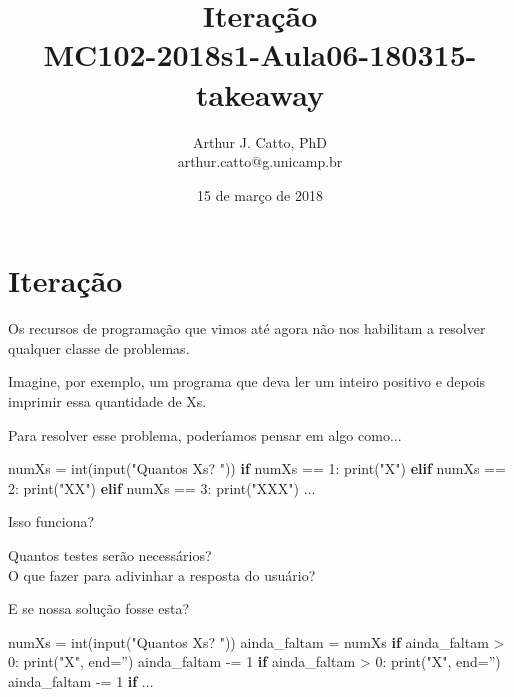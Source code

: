 \documentclass[11pt,a4paper]{article}
\title{Iteração \\
           \small{MC102-2018s1-Aula06-180315-takeaway}
           }
\author{Arthur J. Catto, PhD \\
            \small{arthur.catto@g.unicamp.br}
            }
\date{15 de março de 2018}
\newenvironment{Shaded}{}{}
\newcommand{\DecValTok}[1]{\textcolor[rgb]{0.25,0.63,0.44}{{#1}}}
\newcommand{\StringTok}[1]{\textcolor[rgb]{0.25,0.44,0.63}{{#1}}}
\newcommand{\NormalTok}[1]{{#1}}
\newcommand{\ControlFlowTok}[1]{\textcolor[rgb]{0.00,0.44,0.13}{\textbf{{#1}}}}
\newcommand{\OperatorTok}[1]{\textcolor[rgb]{0.40,0.40,0.40}{{#1}}}
\newcommand{\BuiltInTok}[1]{{#1}}
\begin{document}
    
    
    \maketitle
    
    

    
    \section{Iteração}\label{iterauxe7uxe3o}

    Os recursos de programação que vimos até agora não nos habilitam a
resolver qualquer classe de problemas.

Imagine, por exemplo, um programa que deva ler um inteiro positivo e
depois imprimir essa quantidade de Xs.

    Para resolver esse problema, poderíamos pensar em algo como...

\begin{Shaded}
\begin{Highlighting}[]
\NormalTok{numXs }\OperatorTok{=} \BuiltInTok{int}\NormalTok{(}\BuiltInTok{input}\NormalTok{(}\StringTok{"Quantos Xs? "}\NormalTok{))}
\ControlFlowTok{if}\NormalTok{ numXs }\OperatorTok{==} \DecValTok{1}\NormalTok{:}
   \BuiltInTok{print}\NormalTok{(}\StringTok{"X"}\NormalTok{)}
\ControlFlowTok{elif}\NormalTok{ numXs }\OperatorTok{==} \DecValTok{2}\NormalTok{:}
   \BuiltInTok{print}\NormalTok{(}\StringTok{"XX"}\NormalTok{)}
\ControlFlowTok{elif}\NormalTok{ numXs }\OperatorTok{==} \DecValTok{3}\NormalTok{:}
   \BuiltInTok{print}\NormalTok{(}\StringTok{"XXX"}\NormalTok{)}
\NormalTok{...}
\end{Highlighting}
\end{Shaded}

    Isso funciona?

    Quantos testes serão necessários?\\
O que fazer para adivinhar a resposta do usuário?

    E se nossa solução fosse esta?

    \begin{Shaded}
\begin{Highlighting}[]
\NormalTok{numXs }\OperatorTok{=} \BuiltInTok{int}\NormalTok{(}\BuiltInTok{input}\NormalTok{(}\StringTok{"Quantos Xs? "}\NormalTok{))}
\NormalTok{ainda_faltam }\OperatorTok{=}\NormalTok{ numXs}
\ControlFlowTok{if}\NormalTok{ ainda_faltam }\OperatorTok{>} \DecValTok{0}\NormalTok{:}
   \BuiltInTok{print}\NormalTok{(}\StringTok{"X"}\NormalTok{, end}\OperatorTok{=}\StringTok{''}\NormalTok{)}
\NormalTok{   ainda_faltam }\OperatorTok{-=} \DecValTok{1}
\ControlFlowTok{if}\NormalTok{ ainda_faltam }\OperatorTok{>} \DecValTok{0}\NormalTok{:}
   \BuiltInTok{print}\NormalTok{(}\StringTok{"X"}\NormalTok{, end}\OperatorTok{=}\StringTok{''}\NormalTok{)}
\NormalTok{   ainda_faltam }\OperatorTok{-=} \DecValTok{1}
\ControlFlowTok{if}\NormalTok{ ...}
\end{Highlighting}
\end{Shaded}
\end{document}
